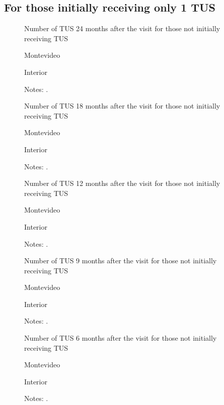 \documentclass[12pt]{article}
\begin{document}
\subsection{For those initially receiving only 1 TUS}

\begin{figure}[H]%
	\caption{Number of TUS 24 months after the visit for those not initially receiving TUS}%
	\centering
	\caption*{ {Montevideo}}
	\qquad
	\caption*{Interior}
	\label{fig:first_stage_si1Tus_tus24}%
	\caption*{ {\footnotesize Notes: .}}
\end{figure}

\begin{figure}[H]%
	\caption{Number of TUS 18 months after the visit for those not initially receiving TUS}%
	\centering
	\caption*{ {Montevideo}}
	\qquad
	\caption*{Interior}
	\label{fig:first_stage_si1Tus_tus18}%
	\caption*{ {\footnotesize Notes: .}}
\end{figure}

\begin{figure}[H]%
	\caption{Number of TUS 12 months after the visit for those not initially receiving TUS}%
	\centering
	\caption*{ {Montevideo}}
	\qquad
	\caption*{Interior}
	\label{fig:first_stage_si1Tus_tus12}%
	\caption*{ {\footnotesize Notes: .}}
\end{figure}

\begin{figure}[H]%
	\caption{Number of TUS 9 months after the visit for those not initially receiving TUS}%
	\centering
	\caption*{ {Montevideo}}
	\qquad
	\caption*{Interior}
	\label{fig:first_stage_si1Tus_tus9}%
	\caption*{ {\footnotesize Notes: .}}
\end{figure}

\begin{figure}[H]%
	\caption{Number of TUS 6 months after the visit for those not initially receiving TUS}%
	\centering
	\caption*{ {Montevideo}}
	\qquad
	\caption*{Interior}
	\label{fig:first_stage_si1Tus_tus6}%
	\caption*{ {\footnotesize Notes: .}}
\end{figure}
\end{document}
